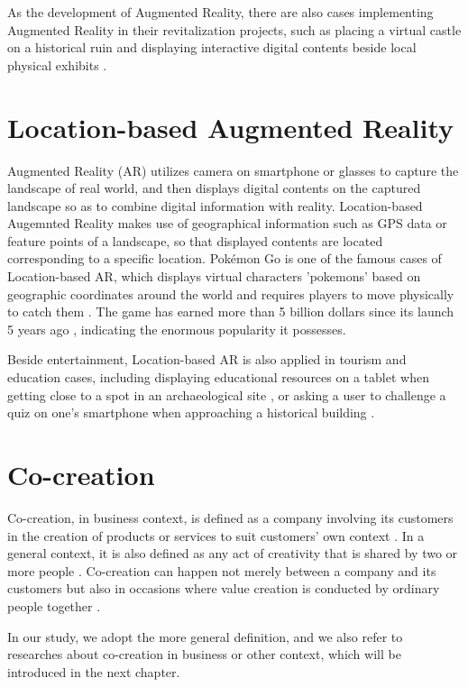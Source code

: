 As the development of Augmented Reality, there are also cases implementing Augmented Reality in their revitalization projects,
such as placing a virtual castle on a historical ruin \cite{井上道哉_長澤可也_2021} and displaying interactive digital contents beside local physical exhibits \cite{センチメンタル価値再生_2016}\cite{armarker_and_behavior_log_2011}.

\section{Location-based Augmented Reality}
Augmented Reality (AR) utilizes camera on smartphone or glasses to capture the landscape of real world,
and then displays digital contents on the captured landscape so as to combine digital information with reality.
Location-based Augemnted Reality makes use of geographical information such as GPS data or feature points of a landscape,
so that displayed contents are located corresponding to a specific location.
Pokémon Go is one of the famous cases of Location-based AR, which displays virtual characters 'pokemons' based on geographic coordinates around the world and requires players to move physically to catch them \cite{pokemongo_homepage}.
The game has earned more than 5 billion dollars since its launch 5 years ago \cite{strategist_2021}, indicating the enormous popularity it possesses.

Beside entertainment, Location-based AR is also applied in tourism and education cases,
including displaying educational resources on a tablet when getting close to a spot in an archaeological site \cite{law_2018},
or asking a user to challenge a quiz on one's smartphone when approaching a historical building \cite{hwang_chang_chen_chen_2017}.

\section{Co-creation}
Co-creation, in business context, is defined as a company involving its customers in the creation of products or services to suit customers' own context \cite{cocreation_definition}.
In a general context, it is also defined as any act of creativity that is shared by two or more people \cite{cocreation_definition_general}.
Co-creation can happen not merely between a company and its customers but also in occasions where value creation is conducted by ordinary people together \cite{cocreation_general_case}.

In our study, we adopt the more general definition, and we also refer to researches about co-creation in business or other context,
which will be introduced in the next chapter.